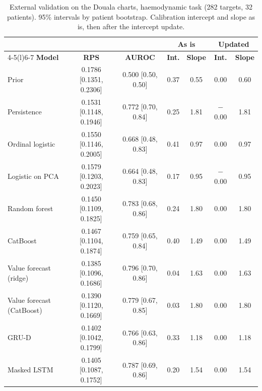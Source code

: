 \begin{table}[htbp]
\centering\footnotesize
\caption{External validation on the Douala charts, haemodynamic task (282 targets, 32 patients). 95\% intervals by patient bootstrap. Calibration intercept and slope as is, then after the intercept update.}\label{tab:ext-haemodynamic}
\begin{tabular}{@{}lcccccc@{}}
\toprule
 & & & \multicolumn{2}{c}{\textbf{As is}} & \multicolumn{2}{c}{\textbf{Updated}} \\
\cmidrule(lr){4-5}\cmidrule(l){6-7}
\textbf{Model} & \textbf{RPS} & \textbf{AUROC} & \textbf{Int.} & \textbf{Slope} & \textbf{Int.} & \textbf{Slope} \\
\midrule
Prior & 0.1786 [0.1351, 0.2306] & 0.500 [0.50, 0.50] & 0.37 & 0.55 & 0.00 & 0.60 \\
Persistence & 0.1531 [0.1148, 0.1946] & 0.772 [0.70, 0.84] & 0.25 & 1.81 & $-$0.00 & 1.81 \\
Ordinal logistic & 0.1550 [0.1146, 0.2005] & 0.668 [0.48, 0.83] & 0.41 & 0.97 & 0.00 & 0.97 \\
Logistic on PCA & 0.1579 [0.1203, 0.2023] & 0.664 [0.48, 0.83] & 0.17 & 0.95 & $-$0.00 & 0.95 \\
Random forest & 0.1450 [0.1109, 0.1825] & 0.783 [0.68, 0.86] & 0.24 & 1.80 & 0.00 & 1.80 \\
CatBoost & 0.1467 [0.1104, 0.1874] & 0.759 [0.65, 0.84] & 0.40 & 1.49 & 0.00 & 1.49 \\
Value forecast (ridge) & 0.1385 [0.1096, 0.1686] & 0.796 [0.70, 0.86] & 0.04 & 1.63 & 0.00 & 1.63 \\
Value forecast (CatBoost) & 0.1390 [0.1120, 0.1669] & 0.779 [0.67, 0.85] & 0.03 & 1.80 & 0.00 & 1.80 \\
GRU-D & 0.1402 [0.1042, 0.1799] & 0.766 [0.63, 0.86] & 0.33 & 1.18 & 0.00 & 1.18 \\
Masked LSTM & 0.1405 [0.1087, 0.1752] & 0.787 [0.69, 0.86] & 0.20 & 1.54 & 0.00 & 1.54 \\
\bottomrule
\end{tabular}
\end{table}
